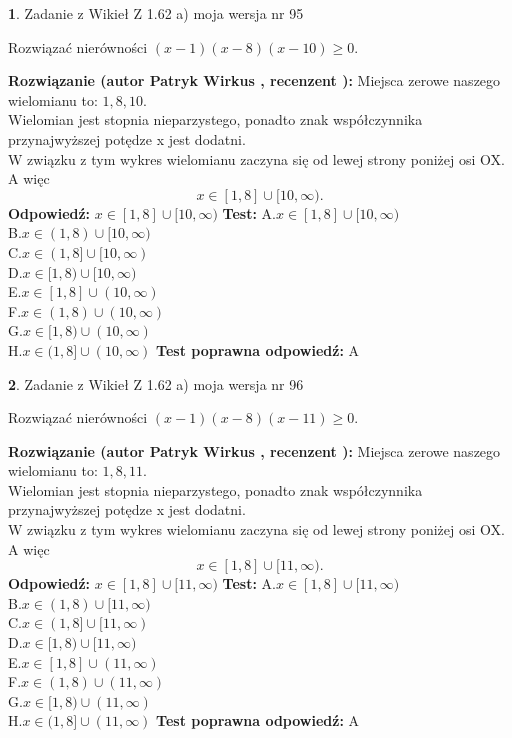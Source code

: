 \documentclass[12pt, a4paper]{article}
\theoremstyle{definition} %
\newtheorem{zad}{}
\newcommand{\zadStart}[1]{\begin{zad}#1\newline}
\newcommand{\zadStop}{\end{zad}}
\newcommand{\rozwStart}[2]{\noindent \textbf{Rozwiązanie (autor #1 , recenzent #2): }\newline}
\newcommand{\rozwStop}{\newline}
\newcommand{\odpStart}{\noindent \textbf{Odpowiedź:}\newline}
\newcommand{\odpStop}{\newline}
\newcommand{\testStart}{\noindent \textbf{Test:}\newline}
\newcommand{\testStop}{\newline}
\newcommand{\kluczStart}{\noindent \textbf{Test poprawna odpowiedź:}\newline}
\newcommand{\kluczStop}{\newline}
\begin{document}
\zadStart{Zadanie z Wikieł Z 1.62 a) moja wersja nr 95}

Rozwiązać nierówności $(x-1)(x-8)(x-10)\ge0$.
\zadStop
\rozwStart{Patryk Wirkus}{}
Miejsca zerowe naszego wielomianu to: $1, 8, 10$.\\
Wielomian jest stopnia nieparzystego, ponadto znak współczynnika przy\linebreak najwyższej potędze x jest dodatni.\\ W związku z tym wykres wielomianu zaczyna się od lewej strony poniżej osi OX. A więc $$x \in [1,8] \cup [10,\infty).$$
\rozwStop
\odpStart
$x \in [1,8] \cup [10,\infty)$
\odpStop
\testStart
A.$x \in [1,8] \cup [10,\infty)$\\
B.$x \in (1,8) \cup [10,\infty)$\\
C.$x \in (1,8] \cup [10,\infty)$\\
D.$x \in [1,8) \cup [10,\infty)$\\
E.$x \in [1,8] \cup (10,\infty)$\\
F.$x \in (1,8) \cup (10,\infty)$\\
G.$x \in [1,8) \cup (10,\infty)$\\
H.$x \in (1,8] \cup (10,\infty)$
\testStop
\kluczStart
A
\kluczStop



\zadStart{Zadanie z Wikieł Z 1.62 a) moja wersja nr 96}

Rozwiązać nierówności $(x-1)(x-8)(x-11)\ge0$.
\zadStop
\rozwStart{Patryk Wirkus}{}
Miejsca zerowe naszego wielomianu to: $1, 8, 11$.\\
Wielomian jest stopnia nieparzystego, ponadto znak współczynnika przy\linebreak najwyższej potędze x jest dodatni.\\ W związku z tym wykres wielomianu zaczyna się od lewej strony poniżej osi OX. A więc $$x \in [1,8] \cup [11,\infty).$$
\rozwStop
\odpStart
$x \in [1,8] \cup [11,\infty)$
\odpStop
\testStart
A.$x \in [1,8] \cup [11,\infty)$\\
B.$x \in (1,8) \cup [11,\infty)$\\
C.$x \in (1,8] \cup [11,\infty)$\\
D.$x \in [1,8) \cup [11,\infty)$\\
E.$x \in [1,8] \cup (11,\infty)$\\
F.$x \in (1,8) \cup (11,\infty)$\\
G.$x \in [1,8) \cup (11,\infty)$\\
H.$x \in (1,8] \cup (11,\infty)$
\testStop
\kluczStart
A
\kluczStop
\end{document}
